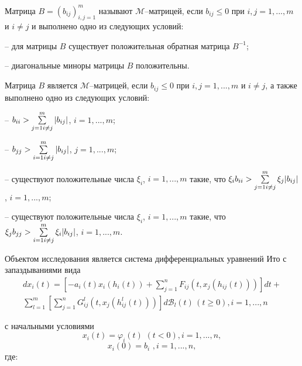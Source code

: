 \begin{definition}\label{kad-def1}\cite{kad9} Матрица $B = (b_{ij})^m_{i,j=1}$ называют
$\mathcal M$--матрицей, если $b_{ij} \leq 0$ при $i, j = 1,...,m$ и
$i\neq j$ и выполнено одно из следующих условий:

\noindent-- для матрицы $B$ существует положительная обратная матрица
$B^{-1}$;

\noindent-- диагональные миноры матрицы $B$ положительны.
\end{definition}
\begin{lemma}\label{kad-lem1}
\cite{kad9} Матрица $B$ является $\mathcal M$--матрицей, если
$b_{ij} \leq 0$ при $i, j = 1,...,m$ и $i\neq j$, а также выполнено
одно из следующих условий:

\noindent-- $b_{ii} > \sum \limits _{j=1\\ i \neq j}^m|b_{ij}|$, $i =
1,...,m$;

\noindent-- $b_{jj} > \sum \limits _{i=1\\ i \neq j}^m|b_{ij}|$, $j =
1,...,m$;

\noindent-- существуют положительные числа $\xi _i$, $i = 1,...,m$ такие, что
$\xi_i b_{ii} > \sum \limits _{j=1\\ i \neq j}^m\xi_j |b_{ij}|$, $i
= 1,...,m$;

\noindent-- существуют положительные числа $\xi _i$, $i = 1,...,m$ такие, что
$\xi_j b_{jj} > \sum \limits _{i=1\\ i \neq j}^m\xi_i |b_{ij}|$, $i
= 1,...,m$.
\end{lemma}
Объектом исследования является система дифференциальных уравнений
Ито с запаздываниями вида
\begin{equation}\label{kad-eq1}
\begin{array}{crl}
dx_i(t) = \left [-a_i(t)x_i(h_i(t))+ \sum
\limits_{j=1}^nF_{ij}(t,x_j(h_{ij}(t)))\right]dt +\\
 \sum \limits_{l=1}^m \left [\sum
\limits_{j=1}^nG^l_{ij}(t,x_j(h^l_{ij}(t)))\right ]d\mathcal B_l(t)
\, (t \ge 0), i = 1,...,n
\end{array}
\end{equation}

с начальными условиями
\begin{equation}\label{kad-eq1a}
x_i(t) = \varphi_i(t) {\,\,} (t <0), i = 1,...,n, %
\end{equation}
\begin{equation}\label{kad-eq1b}
x_i(0) = b_i {\,\,}, i = 1,...,n, %
\end{equation}
где:

